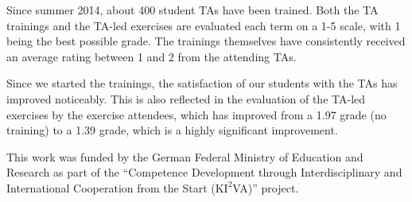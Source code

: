 \documentclass[sigconf,screen]{acmart}
\begin{document}
Since summer 2014, about 400 student TAs have been trained. 
Both the TA trainings and the TA-led exercises are evaluated each term on a 1-5 scale, 
with 1 being the best possible grade. The trainings themselves have consistently received an average
rating between 1 and 2 from the attending TAs.

Since we started the trainings, the satisfaction of our students with the TAs has improved noticeably.
This is also reflected in the evaluation of the TA-led exercises by the exercise 
attendees, which has improved from a 1.97 grade (no training) to a 1.39 grade, which is a
highly significant improvement.

\begin{acks}
This work was funded by the German Federal Ministry of Education and Research as part of the 
``Competence Development through Interdisciplinary and International Cooperation from the Start
(K$\mathrm{I^2}$VA)'' project.
\end{acks}



\end{document}
